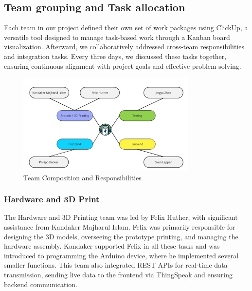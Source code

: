 \subsection{Team grouping and Task allocation}

Each team in our project defined their own set of work packages using ClickUp, a versatile tool designed to manage task-based work through a Kanban board visualization. Afterward, we collaboratively addressed cross-team responsibilities and integration tasks. Every three days, we discussed these tasks together, ensuring continuous alignment with project goals and effective problem-solving.

\begin{figure}[h]
    \centering
    \includegraphics[width=0.8\textwidth]{images/project_split}
    \caption{Team Composition and Responsibilities}
\end{figure}


\newpage
\subsubsection{Hardware and 3D Print}
The Hardware and 3D Printing team was led by Felix Huther, with significant assistance from Kandaker Majharul Islam. Felix was primarily responsible for designing the 3D models, overseeing the prototype printing, and managing the hardware assembly. Kandaker supported Felix in all these tasks and was introduced to programming the Arduino device, where he implemented several smaller functions. This team also integrated REST APIs for real-time data transmission, sending live data to the frontend via ThingSpeak and ensuring backend communication.

